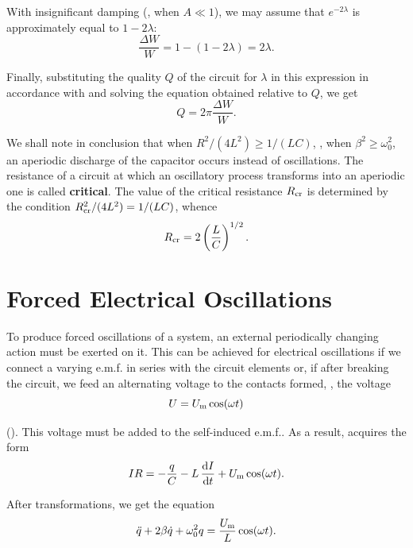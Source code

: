 \noindent
With insignificant damping (\ie, when $A\ll 1$), we may assume that $e^{-2\lambda}$ is approximately equal to $1-2\lambda$:
\begin{equation*}
    \frac{\Delta{W}}{W} = 1 - (1 - 2\lambda) = 2 \lambda.
\end{equation*}

\noindent
Finally, substituting the quality $Q$ of the circuit for $\lambda$ in this expression in accordance with  and solving the equation obtained relative to $Q$, we get
\begin{equation}\label{eq:13_23}
    Q = 2\pi \frac{\Delta{W}}{W}.
\end{equation}

We shall note in conclusion that when $R^2/(4L^2)\geqslant 1/(LC)$, \ie, when $\beta^2\geqslant\omega_0^2$, an aperiodic discharge of the capacitor occurs instead of oscillations.
The resistance of a circuit at which an oscillatory process transforms into an aperiodic one is called \textbf{critical}.
The value of the critical resistance $R_{\text{cr}}$ is determined by the condition $R_{\text{cr}}^2/(4L^2)= 1/(LC)$, whence
\begin{equation}\label{eq:13_24}
    R_{\text{cr}} = 2 \left(\frac{L}{C}\right)^{1/2}.
\end{equation}

\section{Forced Electrical Oscillations}\label{sec:13_4}

To produce forced oscillations of a system, an external periodically changing action must be exerted on it.
This can be achieved for electrical oscillations if we connect a varying e.m.f. in series with the circuit elements or, if after breaking the circuit, we feed an alternating voltage to the contacts formed, \ie, the voltage
\begin{equation}\label{eq:13_25}
    U = U_{\text{m}} \cos(\omega t)
\end{equation}

\noindent
().
This voltage must be added to the self-induced e.m.f..
As a result,  acquires the form
\begin{equation}\label{eq:13_26}
    IR = - \frac{q}{C} - L\, \dfrac{\mathrm{d} I}{\mathrm{d} t} + U_{\text{m}} \cos(\omega t).
\end{equation}

\noindent
After transformations, we get the equation
\begin{equation}\label{eq:13_27}
    \ddot{q} + 2\beta \dot{q} + \omega_0^2 q = \frac{U_{\text{m}}}{L} \cos(\omega t).
\end{equation}

